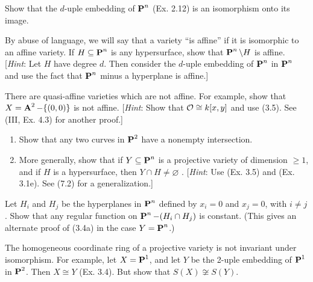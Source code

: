 \documentclass[10pt]{amsart}
\begin{document}
\begin{exercise}[3.4]
    Show that the $d$-uple embedding of $\pp^n$ (Ex. 2.12) is an isomorphism 
    onto its image.
\end{exercise}


\begin{exercise}[3.5]
    By abuse of language, we will say that a variety ``is affine'' if it is 
    isomorphic to an affine variety. If $H \subseteq \pp^n$ is any hypersurface, 
    show that $\pp^n \setminus H$ is affine. 
    [\emph{Hint}: Let $H$ have degree $d$. Then consider the $d$-uple 
    embedding of $\pp^n$ in $\pp^n$ and use the fact that $\pp^n$ minus 
    a hyperplane is affine.]
\end{exercise}


\begin{exercise}[3.6]
    There are quasi-affine varieties which are not affine. For example, show that 
    $X = \aa^2 - \{(0,0)\}$ is not affine. [\emph{Hint}: Show 
    that $\cO \cong k[x,y]$
    and use (3.5). See (III, Ex. 4.3) for another proof.]
\end{exercise}


\begin{exercise}[3.7]  
    \begin{enumerate}[itemsep=2pt]
        \item Show that any two curves in $\pp^2$ have a nonempty intersection.
        \item More generally, show that if $Y \subseteq \pp^n$ is a projective variety of 
        dimension $\ge 1$, and if $H$ is a hypersurface, then $Y \cap H \ne \varnothing$ . 
        [\emph{Hint}: Use (Ex. 3.5) and (Ex. 3.1e). See (7.2) for a generalization.]
    \end{enumerate}
\end{exercise}


\begin{exercise}[3.8]
    Let $H_i$ and $H_j$ be the hyperplanes in $\pp^n$ defined by 
    $x_i = 0$ and $x_j = 0$, with $i \ne j$. Show that any regular function on 
    $\pp^n - (H_i \cap H_j)$ is constant. 
    (This gives an alternate proof of (3.4a) in the case $Y = \pp^n$.)
\end{exercise}


\begin{exercise}[3.9]
    The homogeneous coordinate ring of a projective variety is not invariant under 
    isomorphism. For example, let $X = \pp^1$, and let $Y$ be the 2-uple embedding of $\pp^1$ in $\pp^2$. 
    Then $X \cong Y$ (Ex. 3.4). But show that $S(X) \not\cong S(Y)$.
\end{exercise}
\end{document}
